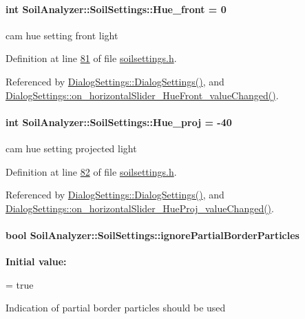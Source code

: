 \paragraph[{Hue\+\_\+front}]{\setlength{\rightskip}{0pt plus 5cm}int Soil\+Analyzer\+::\+Soil\+Settings\+::\+Hue\+\_\+front = 0}\label{class_soil_analyzer_1_1_soil_settings_a85e56e16b6faa940d4a8f36c9a19d14c}
cam hue setting front light 

Definition at line \hyperlink{soilsettings_8h_source_l00081}{81} of file \hyperlink{soilsettings_8h_source}{soilsettings.\+h}.



Referenced by \hyperlink{dialogsettings_8cpp_source_l00005}{Dialog\+Settings\+::\+Dialog\+Settings()}, and \hyperlink{dialogsettings_8cpp_source_l00326}{Dialog\+Settings\+::on\+\_\+horizontal\+Slider\+\_\+\+Hue\+Front\+\_\+value\+Changed()}.

\hypertarget{class_soil_analyzer_1_1_soil_settings_a5267e7cdb6f8bfb18e35cb972b6b7cf3}{}
\paragraph[{Hue\+\_\+proj}]{\setlength{\rightskip}{0pt plus 5cm}int Soil\+Analyzer\+::\+Soil\+Settings\+::\+Hue\+\_\+proj = -\/40}\label{class_soil_analyzer_1_1_soil_settings_a5267e7cdb6f8bfb18e35cb972b6b7cf3}
cam hue setting projected light 

Definition at line \hyperlink{soilsettings_8h_source_l00082}{82} of file \hyperlink{soilsettings_8h_source}{soilsettings.\+h}.



Referenced by \hyperlink{dialogsettings_8cpp_source_l00005}{Dialog\+Settings\+::\+Dialog\+Settings()}, and \hyperlink{dialogsettings_8cpp_source_l00358}{Dialog\+Settings\+::on\+\_\+horizontal\+Slider\+\_\+\+Hue\+Proj\+\_\+value\+Changed()}.

\hypertarget{class_soil_analyzer_1_1_soil_settings_a24fb1d7da2247da77a17d853ea1494d7}{}
\paragraph[{ignore\+Partial\+Border\+Particles}]{\setlength{\rightskip}{0pt plus 5cm}bool Soil\+Analyzer\+::\+Soil\+Settings\+::ignore\+Partial\+Border\+Particles}\label{class_soil_analyzer_1_1_soil_settings_a24fb1d7da2247da77a17d853ea1494d7}
{\bfseries Initial value\+:}
\begin{DoxyCode}
=
      \textcolor{keyword}{true}
\end{DoxyCode}
Indication of partial border particles should be used 


